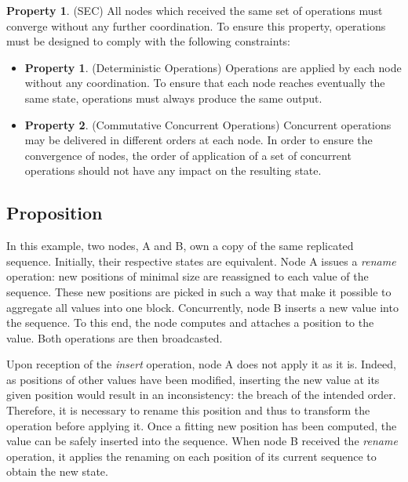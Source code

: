 \documentclass{article}
\theoremstyle{definition}
\newtheorem{property}{Property}
\newtheorem{subproperty}{Property}[property]
\begin{document}
\begin{property}(\acf{SEC})
    All nodes which received the same set of operations must converge without any further coordination.
    To ensure this property, operations must be designed to comply with the following constraints:
    \begin{itemize}[noitemsep]
        \item[~]
        \begin{subproperty}(Deterministic Operations)
            Operations are applied by each node without any coordination.
            To ensure that each node reaches eventually the same state, operations must always produce the same output.
        \end{subproperty}
        \item[~]
        \begin{subproperty}(Commutative Concurrent Operations)
            Concurrent operations may be delivered in different orders at each node.
            In order to ensure the convergence of nodes, the order of application of a set of concurrent operations should not have any impact on the resulting state.
        \end{subproperty}
    \end{itemize}
\end{property}

\subsection{Proposition}
\label{sec:proposition}


In this example, two nodes, A and B, own a copy of the same replicated sequence.
Initially, their respective states are equivalent.
Node A issues a \emph{rename} operation: new positions of minimal size are reassigned to each value of the sequence.
These new positions are picked in such a way that make it possible to aggregate all values into one block.
Concurrently, node B inserts a new value into the sequence.
To this end, the node computes and attaches a position to the value.
Both operations are then broadcasted.

Upon reception of the \emph{insert} operation, node A does not apply it as it is.
Indeed, as positions of other values have been modified, inserting the new value at its given position would result in an inconsistency: the breach of the intended order.
Therefore, it is necessary to rename this position and thus to transform the operation before applying it.
Once a fitting new position has been computed, the value can be safely inserted into the sequence.
When node B received the \emph{rename} operation, it applies the renaming on each position of its current sequence to obtain the new state.
\end{document}
